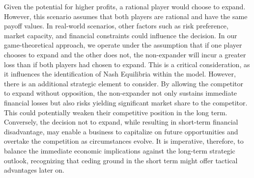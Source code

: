 \documentclass[a4paper, 10pt]{article}
\begin{document}
            Given the potential for higher profits, a rational player would choose to expand. However, this scenario assumes that both players are rational and have the same payoff values. In real-world scenarios, other factors such as risk preference, market capacity, and financial constraints could influence the decision.
            In our game-theoretical approach, we operate under the assumption that if one player chooses to expand and the other does not, the non-expander will incur a greater loss than if both players had chosen to expand. This is a critical consideration, as it influences the identification of Nash Equilibria within the model. However, there is an additional strategic element to consider. By allowing the competitor to expand without opposition, the non-expander not only sustains immediate financial losses but also risks yielding significant market share to the competitor. This could potentially weaken their competitive position in the long term. Conversely, the decision not to expand, while resulting in short-term financial disadvantage, may enable a business to capitalize on future opportunities and overtake the competition as circumstances evolve. It is imperative, therefore, to balance the immediate economic implications against the long-term strategic outlook, recognizing that ceding ground in the short term might offer tactical advantages later on.
\end{document}
